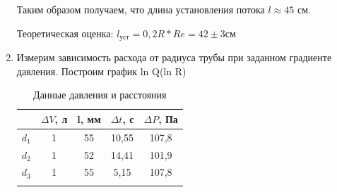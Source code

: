 \documentclass[a4paper, 12pt]{article}%
\begin{document}
\begin{enumerate}
	\begin{figure}[H]
		\caption{}
	\end{figure}
	Таким образом получаем, что длина установления потока $l \approx 45$ см.
	
	Теоретическая оценка: 	$ l_\text{уст} = 0,2 R*Re = 42 \pm 3$см
	
	\item Измерим зависимость расхода от радиуса трубы при заданном градиенте
	давления. Построим график ln Q(ln R)
	
	
	\begin{longtable}{|c|c|c|c|c|}
		\hline 
		 & $\Delta V$, л & l, мм& $\Delta t$, с& $\Delta P$, Па\\
		\hline
		$d_1$ & 1 & 55&10,55&107,8\\
		\hline
		$d_2$ & 1 & 52&14,41&101,9\\
		\hline
		$d_3$ & 1 & 55&5,15&107,8\\
		\hline
		\caption{Данные давления и расстояния}
	\end{longtable}
	
	
	\begin{figure}[H]
		\caption{}
	\end{figure}
	

\end{enumerate}
\end{document}
